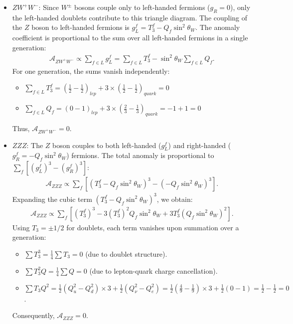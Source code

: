 \begin{itemize}
    \item $ZW^+W^-$: 
    Since $W^\pm$ bosons couple only to left-handed fermions ($g_R = 0$), only the left-handed doublets contribute to this triangle diagram. The coupling of the $Z$ boson to left-handed fermions is $g_L^f = T_3^f - Q_f \sin^2\theta_W$. The anomaly coefficient is proportional to the sum over all left-handed fermions in a single generation:
    \begin{align}
        \mathcal{A}_{ZW^+W^-} \propto \sum_{f \in L} g_L^f = \sum_{f \in L} T_3^f - \sin^2\theta_W \sum_{f \in L} Q_f.
    \end{align}
    For one generation, the sums vanish independently:
    \begin{itemize}
        \item $\sum_{f \in L} T_3^f = (\frac{1}{2} - \frac{1}{2})_{lep} + 3 \times (\frac{1}{2} - \frac{1}{2})_{quark} = 0$
        \item $\sum_{f \in L} Q_f = (0 - 1)_{lep} + 3 \times (\frac{2}{3} - \frac{1}{3})_{quark} = -1 + 1 = 0$
    \end{itemize}
    Thus, $\mathcal{A}_{ZW^+W^-} = 0$.

    \item {$ZZZ$}: 
    The $Z$ boson couples to both left-handed ($g_L^f$) and right-handed ($g_R^f = -Q_f \sin^2\theta_W$) fermions. The total anomaly is proportional to $\sum_f [(g_L^f)^3 - (g_R^f)^3]$:
    \begin{align}
        \mathcal{A}_{ZZZ} \propto \sum_f \left[ (T_3^f - Q_f \sin^2\theta_W)^3 - (-Q_f \sin^2\theta_W)^3 \right].
    \end{align}
    Expanding the cubic term $(T_3^f - Q_f \sin^2\theta_W)^3$, we obtain:
    \begin{align}
        \mathcal{A}_{ZZZ} \propto \sum_f \left[ (T_3^f)^3 - 3(T_3^f)^2 Q_f \sin^2\theta_W + 3 T_3^f (Q_f \sin^2\theta_W)^2 \right].
    \end{align}
    Using $T_3 = \pm 1/2$ for doublets, each term vanishes upon summation over a generation:
    \begin{itemize}
        \item $\sum T_3^3 = \frac{1}{4} \sum T_3 = 0$ (due to doublet structure).
        \item $\sum T_3^2 Q = \frac{1}{4} \sum Q = 0$ (due to lepton-quark charge cancellation).
        \item $\sum T_3 Q^2 = \frac{1}{2}(Q_u^2 - Q_d^2) \times 3 + \frac{1}{2}(Q_\nu^2 - Q_e^2) = \frac{1}{2}(\frac{4}{9} - \frac{1}{9}) \times 3 + \frac{1}{2}(0 - 1) = \frac{1}{2} - \frac{1}{2} = 0$.
    \end{itemize}
    Consequently, $\mathcal{A}_{ZZZ} = 0$.


\end{itemize}
